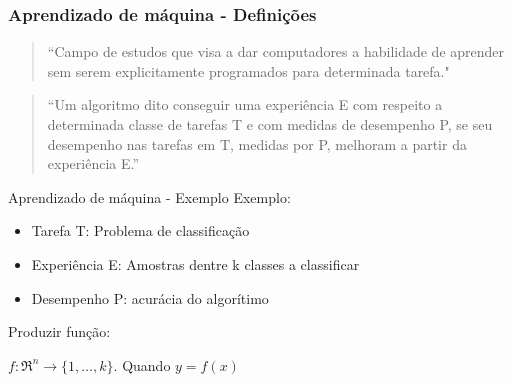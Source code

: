 \documentclass[8pt]{beamer}
\begin{document}
\begin{frame}
\frametitle{Aprendizado de máquina - Definições}

\begin{quotation}
    
“Campo de estudos que visa a dar computadores a habilidade de aprender sem serem explicitamente programados para determinada tarefa." ~\cite{Samuel1959SomeSI}
\end{quotation}

\begin{quotation}
“Um algoritmo dito conseguir uma experiência E com respeito a determinada classe de tarefas T e com medidas de desempenho P, se seu desempenho nas tarefas em T, medidas por P, melhoram a partir da experiência E.” ~\cite{Mitchell97} 
\end{quotation}


\end{frame}


\begin{frame}{Aprendizado de máquina - Exemplo}
    Exemplo:  

    \begin{itemize}
        \item Tarefa T: Problema de classificação
        \item Experiência E: Amostras dentre k classes a classificar
        \item Desempenho P: acurácia do algorítimo
    \end{itemize}
    
    Produzir função:

    \(f:\Re^n\rightarrow \{1,\ldots,k\}\). Quando \( y=f(x) \)
    \end{frame}
\end{document}
